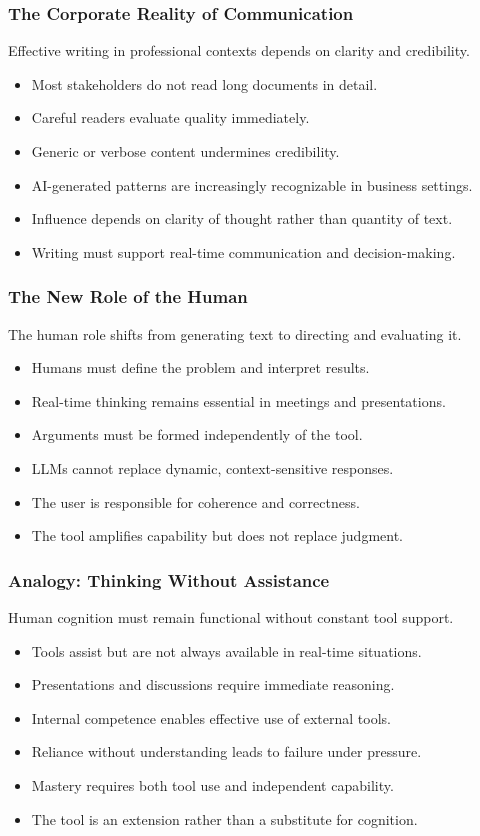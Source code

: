 \documentclass{beamer}
\begin{document}
\frame
{
   \frametitle{The Corporate Reality of Communication}

    Effective writing in professional contexts depends on clarity and credibility.

    \begin{itemize}
        \item Most stakeholders do not read long documents in detail.
        \item Careful readers evaluate quality immediately.
        \item Generic or verbose content undermines credibility.
        \item AI-generated patterns are increasingly recognizable in business settings.
        \item Influence depends on clarity of thought rather than quantity of text.
        \item Writing must support real-time communication and decision-making.
    \end{itemize}
}

\frame
{
   \frametitle{The New Role of the Human}

    The human role shifts from generating text to directing and evaluating it.

    \begin{itemize}
        \item Humans must define the problem and interpret results.
        \item Real-time thinking remains essential in meetings and presentations.
        \item Arguments must be formed independently of the tool.
        \item LLMs cannot replace dynamic, context-sensitive responses.
        \item The user is responsible for coherence and correctness.
        \item The tool amplifies capability but does not replace judgment.
    \end{itemize}
}

\frame
{
   \frametitle{Analogy: Thinking Without Assistance}

    Human cognition must remain functional without constant tool support.

    \begin{itemize}
        \item Tools assist but are not always available in real-time situations.
        \item Presentations and discussions require immediate reasoning.
        \item Internal competence enables effective use of external tools.
        \item Reliance without understanding leads to failure under pressure.
        \item Mastery requires both tool use and independent capability.
        \item The tool is an extension rather than a substitute for cognition.
    \end{itemize}
}
\end{document}
